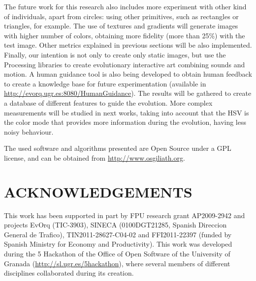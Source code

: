 \documentclass[a4paper,twoside]{article}
\begin{document}
The future work for this research also includes more experiment with other kind of individuals, apart from circles: using other primitives, such as rectangles or triangles, for example. The use of textures and gradients will generate images with higher number of colors, obtaining more fidelity (more than 25\%) with the test image. Other metrics explained in previous sections will be also implemented. Finally, our intention is not only to create only static images, but use the Processing libraries to create evolutionary interactive art combining sounds and motion. A human guidance tool is also being developed to obtain human feedback to create a knowledge base for future experimentation (available in \url{http://evorq.ugr.es:8080/HumanGuidance}). The results will be gathered to create a database of different features to guide the evolution. More complex measurements will be studied in next works, taking into account that the HSV is the color mode that provides more information during the evolution, having less noisy behaviour.

The used software and algorithms presented are Open Source under a GPL license, and can be obtained from \url{http://www.osgiliath.org}.

\section*{\uppercase{acknowledgements}}
\noindent This work has been supported in part by FPU research grant AP2009-2942 and projects EvOrq (TIC-3903), SINECA (0100DGT21285, Spanish Direccion General de Trafico), TIN2011-28627-C04-02 and FFI2011-22397 (funded by Spanish Ministry for Economy and Productivity). This work was developed during the 5 Hackathon of the Office of Open Software of the University of Granada (\url{http://sl.ugr.es/5hackathon}), where several members of different disciplines collaborated during its creation. 

\vfill


\end{document}
